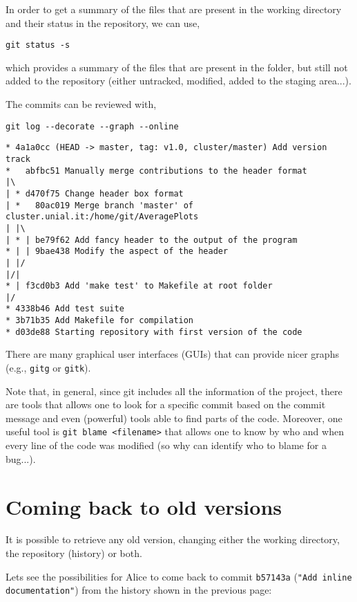\documentclass[a4paper,10pt]{article}
\begin{document}
In order to get a summary of the files that are present in the working directory and their status in the repository, we can use,

\begin{lstlisting}[style=Alice]
 git status -s
\end{lstlisting}
which provides a summary of the files that are present in the folder, but still not added to the repository (either untracked, modified, added to the staging area...).

The commits can be reviewed with,
\begin{lstlisting}[style=Alice]
 git log --decorate --graph --online
\end{lstlisting}

\begin{lstlisting}[style=Output,basicstyle=\small\ttfamily]
* 4a1a0cc (HEAD -> master, tag: v1.0, cluster/master) Add version track
*   abfbc51 Manually merge contributions to the header format
|\  
| * d470f75 Change header box format
| *   80ac019 Merge branch 'master' of cluster.unial.it:/home/git/AveragePlots
| |\  
| * | be79f62 Add fancy header to the output of the program
* | | 9bae438 Modify the aspect of the header
| |/  
|/|   
* | f3cd0b3 Add 'make test' to Makefile at root folder
|/  
* 4338b46 Add test suite
* 3b71b35 Add Makefile for compilation
* d03de88 Starting repository with first version of the code
\end{lstlisting}

There are many graphical user interfaces (GUIs) that can provide nicer graphs (e.g., \texttt{gitg} or \texttt{gitk}).

Note that, in general, since git includes all the information of the project, there are tools that allows one to look for a specific commit based on the commit message and even (powerful) tools able to find parts of the code. Moreover, one useful tool is \texttt{git blame <filename>} that allows one to know by who and when every line of the code was modified (so why can identify who to blame for a bug...).


\clearpage

\section{Coming back to old versions}

It is possible to retrieve any old version, changing either the working directory, the repository (history) or both.

Lets see the possibilities for Alice to come back to commit \texttt{b57143a} (\texttt{"Add inline documentation"}) from the history shown in the previous page:
\end{document}
